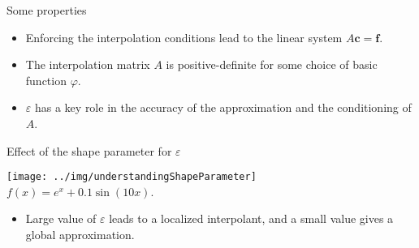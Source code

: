 \documentclass{beamer}
\begin{document}
\begin{frame}{Some properties}
  \begin{itemize}
    \item Enforcing the interpolation conditions lead to the linear system 
      $A\mathbf{c} = \mathbf{f}$.
      
    \item The interpolation matrix $A$ is positive-definite for some choice of
      basic function $\varphi$.

    \item $\varepsilon$ has a key role in the accuracy of the approximation and
      the conditioning of $A$.
  \end{itemize}
\end{frame}

\begin{frame}{Effect of the shape parameter for $\varepsilon$}
  \begin{center}
    \texttt{[image: ../img/understandingShapeParameter]}\\
    $f(x) = e^x + 0.1\sin(10x)$.
  \end{center}

  \begin{itemize}
    \item Large value of $\varepsilon$ leads to a localized interpolant, and a
      small value gives a global approximation.
  \end{itemize}
\end{frame}
\end{document}
